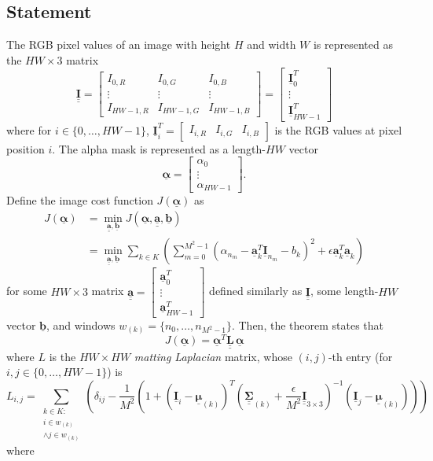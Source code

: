\documentclass{article}
\newcommand{\bmat}[1]{\begin{bmatrix}#1\end{bmatrix}}
\theoremstyle{definition}
\def\vt#1{\underline{\mathbf{#1}}}
\def\vts#1{\underline{\boldsymbol{#1}}}
\def\mt#1{\underline{\underline{\mathbf{#1}}}}
\def\mts#1{\underline{\underline{\boldsymbol{#1}}}}
\begin{document}
\subsection{Statement}\label{appendix:theorem-1-statement}
The RGB pixel values of an image with height $H$ and width $W$ is represented as the $HW\times3$ matrix
$$\mt I = \bmat{
    I_{0,R} & I_{0,G} &  I_{0,B} \\
    \vdots & \vdots & \vdots \\
    I_{HW-1,R} & I_{HW-1,G} &  I_{HW-1,B}
} = \bmat{\vt I_0^T \\ \vdots \\ \vt I_{HW-1}^T}$$
where for $i\in\{0,\dots,HW-1\}$, $\vt I_i^T = \bmat{I_{i,R} & I_{i,G} & I_{i, B}}$ is the RGB values at pixel position $i$. The alpha mask is represented as a length-$HW$ vector
$$\vts\alpha = \bmat{\alpha_0\\\vdots\\\alpha_{HW-1}}.$$
Define the image cost function $J(\vts\alpha)$ as
\begin{align*}
    J(\vts\alpha) &= \min_{\mt a,\vt b} J(\vts\alpha, \mt a, \vt b)\\
    &= \min_{\mt a,\vt b} \sum_{k\in K} \left(\sum_{m=0}^{M^2-1} \left(\alpha_{n_m} - \vt a_k^T \vt I_{n_m} - b_k\right)^2 + \epsilon \vt a_k^T \vt a_k \right)%
\end{align*}
for some $HW\times 3$ matrix $\mt a=\left[\begin{smallmatrix}\vt a_{0}^T \\ \vdots \\ \vt a_{HW-1}^T\end{smallmatrix}\right]$ defined similarly as $\mt I$, some length-$HW$ vector $\vt b$, and windows $w_{(k)}=\{n_0,\dots,n_{M^2-1}\}$. Then, the theorem states that
$$J(\vts \alpha) = \vts \alpha^T \mt L\, \vts \alpha$$
where $L$ is the $HW\times HW$ \emph{matting Laplacian} matrix, whose $(i,j)$-th entry (for $i,j\in\{0,\dots,HW-1\}$) is
$$L_{i,j} = \sum_{\substack{k\in K:\\i\in w_{(k)}\\\wedge j\in w_{(k)}}} \left( \delta_{ij} - \frac1{M^2}\left(1 + \left(\vt{I}_i - \vts \mu_{(k)}\right)^T \left(\mts \Sigma_{(k)} + \frac\epsilon{M^2} \mt{I}_{3\times 3}\right)^{-1} \left(\vt{I}_j - \vts \mu_{(k)}\right) \right) \right)$$
where
\end{document}
